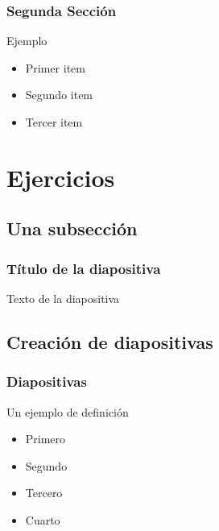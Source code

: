 \documentclass{beamer}
\begin{document}
\begin{frame}

\frametitle{Segunda Sección}

\begin{block}{Ejemplo}
  \begin{itemize}
  \item
  Primer item 
  \pause

  \item
  Segundo item
  \pause

  \item
  Tercer item
  \pause

  \end{itemize}
\end{block}

\end{frame}

\section{Ejercicios}

\subsection{Una subsección}
\begin{frame}
\frametitle{Título de la diapositiva}

Texto de la diapositiva
\end{frame}

\subsection{Creación de diapositivas}

\begin{frame}
\frametitle{Diapositivas}

\begin{definition}
  Un ejemplo de definición
\end{definition}

\begin{example}
  \begin{itemize}
    \item <1-> Primero \pause
    \item <2-> Segundo \pause
    \item <3-> Tercero \pause
    \item <4-> Cuarto  \pause
  \end{itemize}
\end{example}

\end{frame}
\end{document}

